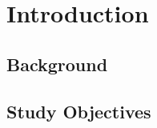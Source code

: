 \newpage
\chapter{Introduction}
\label{chap:introduction}

\section{Background}


\section{Study Objectives}
\label{sec:study-aims}

